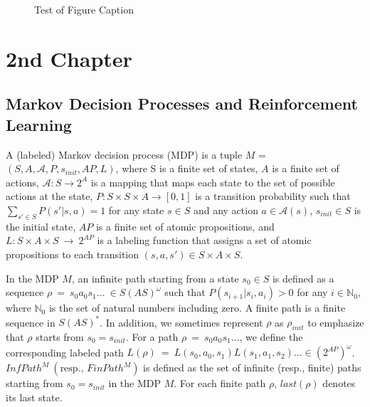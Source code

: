 \documentclass[a4j,12pt,oneside,openany,english]{jsbook}
\begin{document}
\begin{figure}
	\caption{Test of Figure Caption}
\end{figure}


\chapter{2nd Chapter}

\section{Markov Decision Processes and Reinforcement Learning}

\begin{definition}
A (labeled) Markov decision process (MDP) is a tuple $M$ = $(S, A, \mathcal{A}, P, s_{init}, AP, L)$, where S is a finite set of states, $A$ is a finite set of actions, $\mathcal{A} : S \rightarrow 2^A$ is a mapping that maps each state to the set of possible actions at the state, $P:S \times S \times A \rightarrow [0,1]$ is a transition probability such that $\sum_{s' \in S} P(s'|s,a) = 1$ for any state $s \in S$ and any action $a \in \mathcal{A}(s) $, $s_{init} \in S$ is the initial state, $AP$ is a finite set of atomic propositions, and $L : S \times A \times S\ \rightarrow\ 2^{AP}$ is a labeling function that assigns a set of atomic propositions to each transition $(s, a, s') \in S \times A \times S$.

In the MDP $M$, an infinite path starting from a state $s_0 \in S$ is defined as a sequence $\rho\ =\ s_0a_0s_1 \ldots\ \in S (A S)^{\omega}$ such that $P(s_{i+1}|s_i, a_i) > 0$ for any $ i \in \mathbb{N}_0$, where $\mathbb{N}_0$ is the set of natural numbers including zero.  A finite path is a finite sequence in $S (A S)^*$. In addition, we sometimes represent $\rho$ as $\rho_{init}$ to emphasize that $\rho$ starts from $s_0 = s_{init}$.
For a path $\rho\ =\ s_0a_0s_1 \ldots$, we define the corresponding labeled path $L(\rho)\ =\ L(s_0,a_0,s_1)L(s_1,a_1,s_2) \ldots \in (2^{AP})^{\omega}$. $InfPath^{M}\ ( \text{resp., }FinPath^{M})$ is defined as the set of infinite (resp., finite) paths starting from $s_0=s_{init}$ in the MDP $M$. For each finite path $\rho$, $last(\rho)$ denotes its last state.
\label{MDP}
\end{definition}
\end{document}
